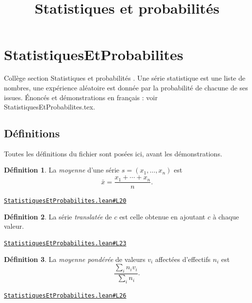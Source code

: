 \documentclass[11pt,a4paper]{article}
\title{Statistiques et probabilités}
\date{}
\theoremstyle{definition}
\newtheorem{definition}{Définition}
\theoremstyle{plain}
\newcommand{\source}[2]{\par\smallskip\noindent\hfill{\footnotesize\href{#1}{\texttt{#2}}}\par\smallskip}
\begin{document}
\maketitle
\sloppy

\section{StatistiquesEtProbabilites}

\noindent
Collège \textemdash{} section \og{} Statistiques et probabilités \fg{}.
Une série statistique est une liste de nombres, une expérience aléatoire est donnée par
la probabilité de chacune de ses issues.
Énoncés et démonstrations en français : voir StatistiquesEtProbabilites.tex.

\subsection{Définitions}

\noindent
Toutes les définitions du fichier sont posées ici, avant les démonstrations.

\begin{definition}
La \emph{moyenne} d'une série $s = (x_1, \dots, x_n)$ est
\[ \bar{x} = \frac{x_1 + \cdots + x_n}{n} . \]
\end{definition}
\source{https://github.com/Commutator-IO/learn-lean/blob/main/cours/01-college/06-statistiques-et-probabilites/StatistiquesEtProbabilites.lean\#L20}{StatistiquesEtProbabilites.lean\#L20}

\begin{definition}
La série \emph{translatée} de $c$ est celle obtenue en ajoutant $c$ à chaque valeur.
\end{definition}
\source{https://github.com/Commutator-IO/learn-lean/blob/main/cours/01-college/06-statistiques-et-probabilites/StatistiquesEtProbabilites.lean\#L23}{StatistiquesEtProbabilites.lean\#L23}

\begin{definition}
La \emph{moyenne pondérée} de valeurs $v_i$ affectées d'effectifs $n_i$ est
\[ \frac{\sum_i n_i v_i}{\sum_i n_i} . \]
\end{definition}
\source{https://github.com/Commutator-IO/learn-lean/blob/main/cours/01-college/06-statistiques-et-probabilites/StatistiquesEtProbabilites.lean\#L26}{StatistiquesEtProbabilites.lean\#L26}
\end{document}
